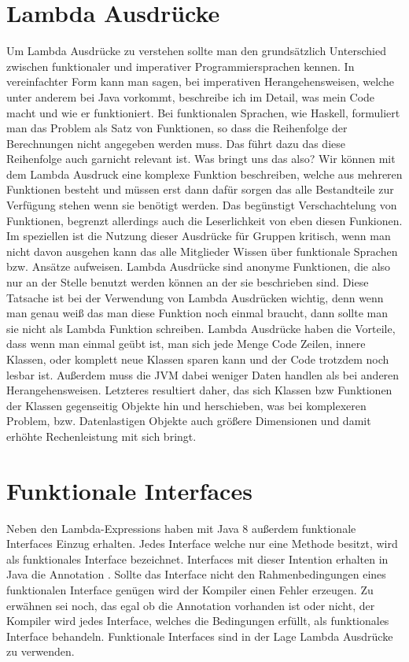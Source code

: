\section{Lambda Ausdrücke}
\label{sec:Lambda}
Um Lambda Ausdrücke zu verstehen sollte man den grundsätzlich Unterschied
zwischen funktionaler und imperativer Programmiersprachen kennen. In
vereinfachter Form kann man sagen, bei imperativen Herangehensweisen, welche
unter anderem bei Java vorkommt, beschreibe ich im Detail, was mein Code macht
und wie er funktioniert. Bei funktionalen Sprachen, wie Haskell, formuliert man
das Problem als Satz von Funktionen, so dass die Reihenfolge der Berechnungen
nicht angegeben werden muss. Das führt dazu das diese Reihenfolge auch garnicht
relevant ist. Was bringt uns das also? Wir können mit dem Lambda Ausdruck eine
komplexe Funktion beschreiben, welche aus mehreren Funktionen besteht und müssen
erst dann dafür sorgen das alle Bestandteile zur Verfügung stehen wenn sie
benötigt werden. Das begünstigt Verschachtelung von Funktionen, begrenzt
allerdings auch die Leserlichkeit von eben diesen Funkionen. Im speziellen ist
die Nutzung dieser Ausdrücke für Gruppen kritisch, wenn man nicht
davon ausgehen kann das alle Mitglieder Wissen über funktionale Sprachen bzw.
Ansätze aufweisen.
Lambda Ausdrücke sind anonyme Funktionen, die also nur an der Stelle benutzt
werden können an der sie beschrieben sind. Diese Tatsache ist bei der Verwendung
von Lambda Ausdrücken wichtig, denn wenn man genau weiß das man diese Funktion
noch einmal braucht, dann sollte man sie nicht als Lambda Funktion schreiben.
Lambda Ausdrücke haben die Vorteile, dass wenn man einmal geübt ist, man sich
jede Menge Code Zeilen, innere Klassen, oder komplett neue Klassen sparen kann
und der Code trotzdem noch lesbar ist. Außerdem muss die JVM dabei weniger Daten
handlen als bei anderen Herangehensweisen. Letzteres resultiert daher, das sich
Klassen bzw Funktionen der Klassen gegenseitig Objekte hin und herschieben, was
bei komplexeren Problem, bzw. Datenlastigen Objekte auch größere Dimensionen und
damit erhöhte Rechenleistung mit sich bringt.

\section{Funktionale Interfaces}
\label{sec:FI}
Neben den Lambda-Expressions haben mit Java 8 außerdem funktionale Interfaces
Einzug erhalten. Jedes Interface welche nur eine Methode besitzt, wird als
funktionales Interface bezeichnet. Interfaces mit dieser Intention erhalten in
Java die Annotation \@FunctionalInterface. Sollte das Interface nicht den
Rahmenbedingungen eines funktionalen Interface genügen wird der Kompiler einen
Fehler erzeugen. Zu erwähnen sei noch, das egal ob die Annotation vorhanden ist
oder nicht, der Kompiler wird jedes Interface, welches die Bedingungen erfüllt,
als funktionales Interface behandeln.
Funktionale Interfaces sind in der Lage Lambda Ausdrücke zu verwenden.

